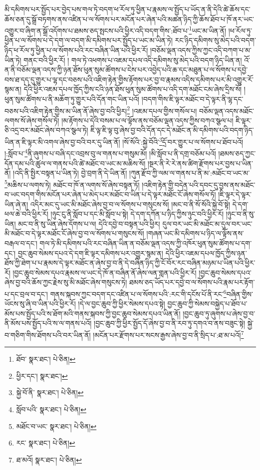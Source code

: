 མི་དམིགས་པར་སྤྱོད་པར་བྱེད་པས་གལ་ཏེ་བདག་ཕ་རོལ་ཏུ་ཕྱིན་པ་རྣམས་ལ་སྤྱོད་པ་ཡོད་ན་ནི་དེའི་ཚེ་ཆོས་དང་ཆོས་ཅན་དུ་སྒྲོ་བཏགས་ནས་འཛིན་པ་ལ་སོགས་པར་མངོན་པར་ཞེན་པའི་མཚན་ཉིད་ཀྱི་ཆོས་ཐོབ་པ་ཁོ་ནར་ཡང་འགྱུར་བ་ཞིག་ན་སྒྲོ་འདོགས་པ་ཐམས་ཅད་སྤངས་པའི་ཕྱིར་འདི་བདག་གིས་:ཐོབ་པ་\footnote{ཐོབ་  སྣར་ཐང་།  པེ་ཅིན། }ཡང་མ་ཡིན་ནོ། །ཕ་རོལ་ཏུ་ཕྱིན་པ་ལ་སོགས་པ་དེ་དག་ལ་བདག་མི་དམིགས་པར་སྤྱོད་པ་ཡང་མ་ཡིན་ཏེ། རང་ཉིད་དམིགས་སུ་མེད་པའི་བདག་ཉིད་ཕ་རོལ་ཏུ་ཕྱིན་པ་ལ་སོགས་པའི་རང་བཞིན་ཡིན་པའི་ཕྱིར་རོ། །བཅོམ་ལྡན་འདས་ཀྱིས་ཀྱང་འདི་བཀག་པ་མ་ཡིན་ཏེ། གནང་བའི་ཕྱིར་རོ། །
གལ་ཏེ་འཕགས་པ་འཇམ་དཔལ་འདི་དམིགས་སུ་མེད་པའི་བདག་ཉིད་ཡིན་ན། འོ་ན་ནི་བཅོམ་ལྡན་འདས་ཀྱི་ཉན་ཐོས་ཕུན་སུམ་ཚོགས་པ་ངེས་པར་འབྱེད་པའི་ཆ་དང་མཐུན་པ་ལ་སོགས་པ་དབྱེ་བས་ཐ་དད་དུ་གྱུར་པ་ལྷ་དང་བཅས་པའི་འཇིག་རྟེན་གྱིས་རྟོགས་པར་བྱ་བ་རྣམས་འདིས་དམིགས་པར་མི་འགྱུར་རོ་སྙམ་ན། དེའི་ཕྱིར་འཇམ་དཔལ་ཁྱོད་ཀྱིས་ངའི་ཉན་ཐོས་ཕུན་སུམ་ཚོགས་པ་འདི་དག་མཐོང་ངམ་ཞེས་དྲིས་སོ། །ཕུན་སུམ་ཚོགས་པ་ནི་མཆོག་ཏུ་གྱུར་པའི་དོན་གང་ཡིན་པའོ། །བདག་གིས་ཇི་ལྟར་མཐོང་བ་དེ་ལྟར་ནི་ལྷ་དང་བཅས་པའི་འཇིག་རྟེན་གྱིས་མ་ཡིན་ནོ་ཞེས་བྱ་བའི་ཕྱིར།\footnote{ཕྱིར་དང་།  སྣར་ཐང་། } །འཇམ་དཔལ་གྱིས་གསོལ་པ། བཅོམ་ལྡན་འདས་མཐོང་ལགས་སོ་ཞེས་གསོལ་ཏོ། །མ་རྟོགས་པ་དེའི་བསམ་པ་ལ་ལྟོས་ནས་བཅོམ་ལྡན་འདས་ཀྱིས་བཀའ་སྩལ་པ། ཇི་ལྟར་ཅི་འདྲ་བར་མཐོང་ཞེས་བཀའ་སྩལ་ཏེ། ཇི་ལྟ་ཇི་ལྟ་བུ་ཞེས་བྱ་བའི་དོན་དང་དེ་མཐོང་ན་མི་དམིགས་པའི་བདག་ཉིད་ཡིན་ན་ཇི་ལྟར་མི་འགལ་ཞེས་བྱ་བའི་བར་དུ་ཡིན་ནོ། །སོ་སོའི་:སྐྱེ་བོའི་\footnote{སྐྱེ་བོ་ནི་  སྣར་ཐང་།  པེ་ཅིན། }དྲོ་བར་གྱུར་པ་ལ་སོགས་པ་ཐོབ་པའོ། །:སློབ་པ་\footnote{སློབ་པའི་  སྣར་ཐང་།  པེ་ཅིན། }ནི་ཞུགས་པ་བཞི་དང་འབྲས་བུ་ལ་གནས་པ་གསུམ་མོ། །མི་སློབ་པ་ནི་དགྲ་བཅོམ་པའོ། །ཐམས་ཅད་ཀྱང་དོན་དམ་པའི་ཚུལ་ལ་གནས་པའི་ཚེ་མཐོང་བ་ཡང་མ་མཆིས་སོ། །སྔར་ནི་རེ་རེ་ནས་ཚིག་རྫོགས་པར་བྱས་པ་ཡིན་ནོ། །འདི་ནི་སྤྱིར་བསྟན་པ་ཡིན་ཏེ། བྱེ་བྲག་ནི་དེ་ཡིན་ནོ། །ཀུན་རྫོབ་ཀྱི་ལམ་ལ་གནས་པ་ནི་མ་:མཐོང་བ་ཡང་མ་\footnote{མཐོང་བ་ཡང་  སྣར་ཐང་།  པེ་ཅིན། }མཆིས་པ་ལགས་ཏེ། མཐོང་བ་ཁོ་ན་ལགས་སོ་ཞེས་བསྟན་ཏོ། །འཇིག་རྟེན་གྱི་བདེན་པའི་དབང་དུ་བྱས་ནས་མཐོང་བ་ཡང་བདག་གིས་མངོན་པར་ཞེན་པ་མེད་པར་མཐོང་བ་ཡིན་པ་དེ་ལྟར་མཐོང་ངོ་ཞེས་གསོལ་ཏོ། །ཇི་ལྟར་དེ་ལྟར་ཡིན་ཞེ་ན། འདིར་མང་དུ་ཡང་མི་མཐོང་ཞེས་བྱ་བ་ལ་སོགས་པ་གསུངས་སོ། །མང་བ་ནི་སོ་སོའི་སྐྱེ་བོ་སྟེ། དེ་དག་ཕལ་ཆེ་བའི་ཕྱིར་རོ། །ཉུང་ངུ་ནི་སློབ་པ་དང་མི་སློབ་པ་སྟེ། དེ་དག་དཀོན་པ་ཉིད་ཀྱིས་ཉུང་བའི་ཕྱིར་རོ། །ཉུང་བ་ནི་སུ་ཡིན། མང་བ་ནི་སུ་ཡིན་ཞེས་དོགས་པ་ལ། དེའི་དབྱེ་བ་བསྟན་པའི་ཕྱིར། དུལ་བར་ཡང་མི་མཐོང་མ་དུལ་བར་ཡང་མི་མཐོང་བ་དེ་ལྟར་མཐོང་ངོ་ཞེས་བྱ་བ་ལ་སོགས་པ་གསུངས་སོ། །གཞན་ཡང་མི་དམིགས་པ་ཉིད་ལ་ལྟོས་ནས་བརྒལ་བ་དང་། གལ་ཏེ་མི་དམིགས་པའི་རང་བཞིན་ཡིན་ན་བཅོམ་ལྡན་འདས་ཀྱི་འཁོར་ཕུན་སུམ་ཚོགས་པ་དག་དང་། བྱང་ཆུབ་སེམས་དཔའ་དེ་དག་ཇི་ལྟར་དམིགས་པར་འགྱུར་སྙམ་ན། དེའི་ཕྱིར་འཇམ་དཔལ་ཁྱོད་ཀྱིས་ཉན་ཐོས་ཀྱི་ཐེག་པ་པ་རྣམས་དེ་ལྟར་མཐོང་ན་ཞེས་བྱ་བ་ནི་དེ་བཞིན་ཉིད་ཀྱི་ངོ་བོར་རང་བཞིན་མཉམ་པ་ཡིན་པའི་ཕྱིར་རོ། །བྱང་ཆུབ་སེམས་དཔའ་རྣམས་ལ་ཡང་དེ་ཁོ་ན་བཞིན་ནོ་ཞེས་ལན་གླན་པའི་ཕྱིར་རོ། །བྱང་ཆུབ་སེམས་དཔའ་ཞེས་བྱ་བའི་ཆོས་ཀྱང་རྗེས་སུ་མི་མཐོང་ཞེས་གསུངས་ཏེ། ཐམས་ཅད་ཡོད་པར་དབྱེ་བ་ལ་སོགས་པའི་རྣམ་པར་རྟོག་པ་དང་བྲལ་བ་དང་། གནས་སྐབས་ཀྱང་བདག་དང་འཛིན་པ་ལ་སོགས་པའི་:རང་གི་དངོས་པོ་ནི་རང་\footnote{རང་  སྣར་ཐང་།  པེ་ཅིན། }བཞིན་གྱིས་ཡོངས་སུ་ཞི་བ་ཡིན་པའི་ཕྱིར་རོ། །དེ་ལ་བྱང་ཆུབ་ཀྱི་ཕྱིར་སེམས་དཔའ་སྟེ། བྱང་ཆུབ་ཀྱི་སེམས་བསྐྱེད་པ་ཐོབ་པ་མོས་པས་སྤྱོད་པའི་ས་ཐོག་མའི་གནས་སྐབས་ཀྱི་བྱང་ཆུབ་སེམས་དཔའ་ཡིན་ནོ། །བྱང་ཆུབ་ཏུ་ཞུགས་པ་ཞེས་བྱ་བ་ནི་མོས་པས་སྤྱོད་པའི་ས་ལ་གནས་པའོ། །བྱང་ཆུབ་ཀྱི་ཕྱིར་སྤྱོད་དོ་ཞེས་བྱ་བ་ནི་རབ་ཏུ་དགའ་བ་ནས་བཟུང་སྟེ། སྐྱེ་བ་གཅིག་གིས་ཐོགས་པའི་བར་ཡིན་ནོ། །མངོན་པར་རྫོགས་པར་སངས་རྒྱས་ཞེས་བྱ་བ་ནི་སྲིད་པ་:ཐ་མ་པའོ།\footnote{ཐ་མའོ།  སྣར་ཐང་།  པེ་ཅིན། } 